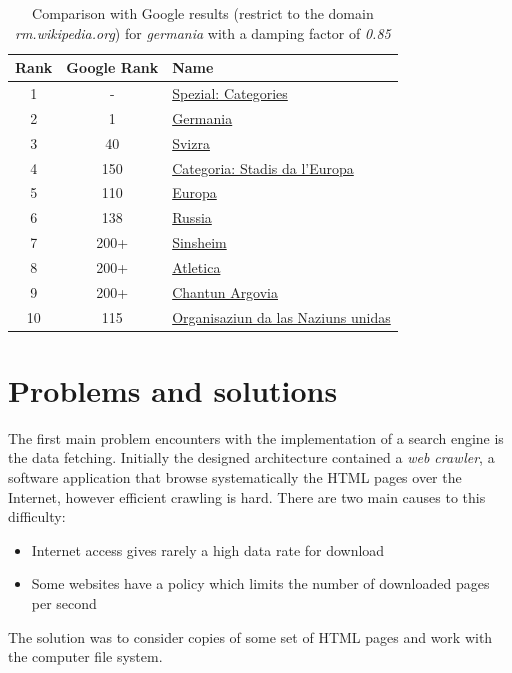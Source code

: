 \documentclass[pdftex,12pt,a4paper]{article}
\begin{document}
\begin{table}[H]
\centering
\begin{tabular}{ | c | c | l | }
\hline
Rank & Google Rank & Name \\ \hline
1 & - & \href{http://rm.wikipedia.org/wiki/Spezial:Categories}{Spezial: Categories} \\ \hline
2 & 1 & \href{http://rm.wikipedia.org/wiki/Germania}{Germania} \\ \hline
3 & 40 & \href{http://rm.wikipedia.org/wiki/Svizra}{Svizra} \\ \hline
4 & 150 & \href{http://rm.wikipedia.org/wiki/Categoria:Stadis_da_l'Europa}{Categoria: Stadis da l'Europa} \\ \hline
5 & 110 & \href{http://rm.wikipedia.org/wiki/Europa}{Europa} \\ \hline
6 & 138 & \href{http://rm.wikipedia.org/wiki/Russia}{Russia} \\ \hline
7 & 200+ & \href{http://rm.wikipedia.org/wiki/Sinsheim}{Sinsheim} \\ \hline
8 & 200+& \href{http://rm.wikipedia.org/wiki/Atletica}{Atletica} \\ \hline
9 & 200+ & \href{http://rm.wikipedia.org/wiki/Chantun_Argovia}{Chantun Argovia} \\ \hline
10 & 115 & \href{http://rm.wikipedia.org/wiki/Organisaziun_da_las_Naziuns_unidas}{Organisaziun da las Naziuns unidas} \\ \hline
\end{tabular}
\caption{Comparison with Google results (restrict to the domain \emph{rm.wikipedia.org}) for \emph{germania} with a damping factor of \emph{0.85}}
\label{table_comparison}
\end{table}


\section{Problems and solutions}

The first main problem encounters with the implementation of a search engine is the data fetching. Initially the designed architecture contained a \emph{web crawler}, a software application that browse systematically the HTML pages over the Internet, however efficient crawling is hard.
There are two main causes to this difficulty:
\begin{itemize}
\item Internet access gives rarely a high data rate for download
\item Some websites have a policy which limits the number of downloaded pages per second
\end{itemize}
The solution was to consider copies of some set of HTML pages and work with the computer file system.
\end{document}
